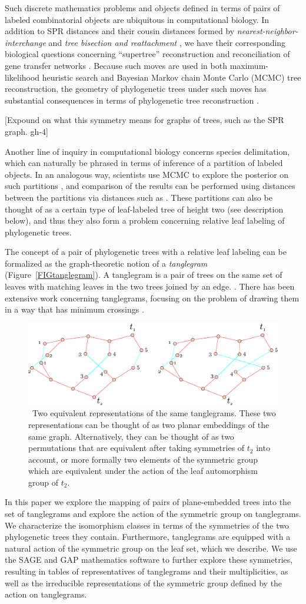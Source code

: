 \documentclass{amsart}
\newcommand{\arxiv}[1]{#1}
\newcommand{\FIGtanglegram}{\
\label{FIGtanglegram}
\begin{figure}
  \arxiv{\includegraphics[width=5in]{figures/relabeling-example}}
\caption{\
  Two equivalent representations of the same tanglegrams.
  These two representations can be thought of as two planar embeddings of the same graph.
  Alternatively, they can be thought of as two permutations that are equivalent after taking symmetries of $t_2$ into account, or more formally two elements of the symmetric group which are equivalent under the action of the leaf automorphism group of $t_2$.
}
\end{figure}
}
\begin{document}
Such discrete mathematics problems and objects defined in terms of pairs of labeled combinatorial objects are ubiquitous in computational biology.
In addition to SPR distances and their cousin distances formed by \emph{nearest-neighbor-interchange} and \emph{tree bisection and reattachment} \cite{wiki:treeRearrangement}, we have their corresponding biological questions concerning ``supertree'' reconstruction \cite{Whidden2014-ku} and reconciliation of gene transfer networks \cite{Boon2013-mc}.
Because such moves are used in both maximum-likelihood heuristic search and Bayesian Markov chain Monte Carlo (MCMC) tree reconstruction, the geometry of phylogenetic trees under such moves has substantial consequences in terms of phylogenetic tree reconstruction \cite{Whidden2014-yt}.

[Expound on what this symmetry means for graphs of trees, such as the SPR graph. gh-4]

Another line of inquiry in computational biology concerns species delimitation, which can naturally be phrased in terms of inference of a partition of labeled objects.
In an analogous way, scientists use MCMC to explore the posterior on such partitions \cite{Yang2010-kc}, and comparison of the results can be performed using distances between the partitions via distances such as \cite{Gusfield2002-il}.
These partitions can also be thought of as a certain type of leaf-labeled tree of height two (see description below), and thus they also form a problem concerning relative leaf labeling of phylogenetic trees.

The concept of a pair of phylogenetic trees with a relative leaf labeling can be formalized as the graph-theoretic notion of a \emph{tanglegram} (Figure~\ref{FIGtanglegram}).
A tanglegram is a pair of trees on the same set of leaves with matching leaves in the two trees joined by an edge. \cite{Venkatachalam2010-zh}.
There has been extensive work concerning tanglegrams, focusing on the problem of drawing them in a way that has minimum crossings \cite{Buchin2008-lc,Lozano2008-tp,Bansal2009-ni,Bocker2009-xl,Fernau2010-an,Venkatachalam2010-zh}.
\FIGtanglegram

In this paper we explore the mapping of pairs of plane-embedded trees into the set of tanglegrams and explore the action of the symmetric group on tanglegrams.
We characterize the isomorphism classes in terms of the symmetries of the two phylogenetic trees they contain.
Furthermore, tanglegrams are equipped with a natural action of the symmetric group on the leaf set, which we describe.
We use the SAGE \cite{SteinJoyner2005} and GAP \cite{GAP4} mathematics software to further explore these symmetries, resulting in tables of representatives of tanglegrams and their multiplicities, as well as the irreducible representations of the symmetric group defined by the action on tanglegrams.
\end{document}
